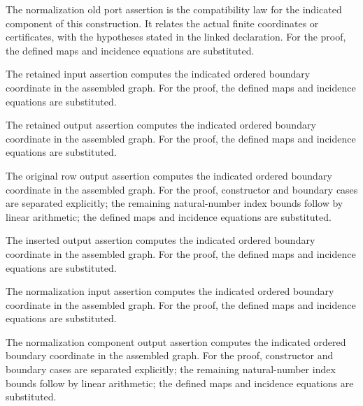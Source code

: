 The normalization old port assertion is the compatibility law for the indicated component of this construction. It relates the actual finite coordinates or certificates, with the hypotheses stated in the linked declaration.
For the proof, the defined maps and incidence equations are substituted.
\par{}

The retained input assertion computes the indicated ordered boundary coordinate in the assembled graph.
For the proof, the defined maps and incidence equations are substituted.
\par{}

The retained output assertion computes the indicated ordered boundary coordinate in the assembled graph.
For the proof, the defined maps and incidence equations are substituted.
\par{}

The original row output assertion computes the indicated ordered boundary coordinate in the assembled graph.
For the proof, constructor and boundary cases are separated explicitly; the remaining natural-number index bounds follow by linear arithmetic; the defined maps and incidence equations are substituted.
\par{}

The inserted output assertion computes the indicated ordered boundary coordinate in the assembled graph.
For the proof, the defined maps and incidence equations are substituted.
\par{}

The normalization input assertion computes the indicated ordered boundary coordinate in the assembled graph.
For the proof, the defined maps and incidence equations are substituted.
\par{}

The normalization component output assertion computes the indicated ordered boundary coordinate in the assembled graph.
For the proof, constructor and boundary cases are separated explicitly; the remaining natural-number index bounds follow by linear arithmetic; the defined maps and incidence equations are substituted.
\par{}

